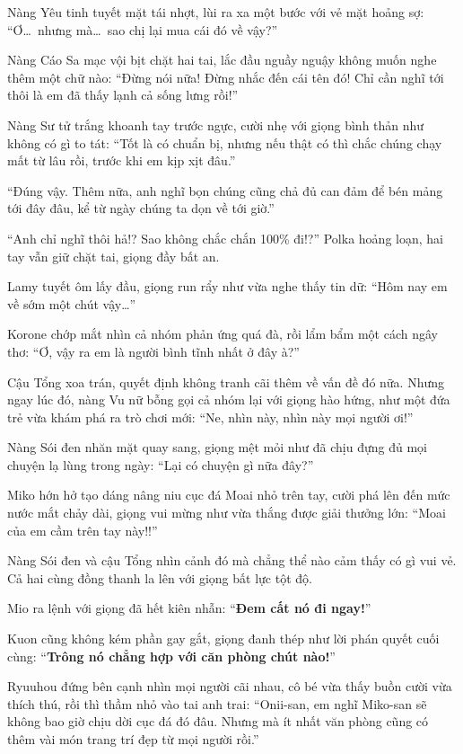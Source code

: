 \documentclass[../main.tex]{subfiles}
\begin{document}
Nàng Yêu tinh tuyết mặt tái nhợt, lùi ra xa một bước với vẻ mặt hoảng sợ: ``Ơ\dots\ nhưng mà\dots\ sao chị lại mua cái đó về vậy?''

Nàng Cáo Sa mạc vội bịt chặt hai tai, lắc đầu nguầy nguậy không muốn nghe thêm một chữ nào: ``Đừng nói nữa! Đừng nhắc đến cái tên đó! Chỉ cần nghĩ tới thôi là em đã thấy lạnh cả sống lưng rồi!''

Nàng Sư tử trắng khoanh tay trước ngực, cười nhẹ với giọng bình thản như không có gì to tát: ``Tốt là có chuẩn bị, nhưng nếu thật có thì chắc chúng chạy mất từ lâu rồi, trước khi em kịp xịt đâu.''

``Đúng vậy. Thêm nữa, anh nghĩ bọn chúng cũng chả đủ can đảm để bén mảng tới đây đâu, kể từ ngày chúng ta dọn về tới giờ.''

``Anh chỉ nghĩ thôi hả!? Sao không chắc chắn 100\% đi!?'' Polka hoảng loạn, hai tay vẫn giữ chặt tai, giọng đầy bất an.

Lamy tuyết ôm lấy đầu, giọng run rẩy như vừa nghe thấy tin dữ: ``Hôm nay em về sớm một chút vậy\dots''

Korone chớp mắt nhìn cả nhóm phản ứng quá đà, rồi lẩm bẩm một cách ngây thơ: ``Ơ, vậy ra em là người bình tĩnh nhất ở đây à?''

Cậu Tổng xoa trán, quyết định không tranh cãi thêm về vấn đề đó nữa. Nhưng ngay lúc đó, nàng Vu nữ bỗng gọi cả nhóm lại với giọng hào hứng, như một đứa trẻ vừa khám phá ra trò chơi mới: ``Ne, nhìn này, nhìn này mọi người ơi!''

Nàng Sói đen nhăn mặt quay sang, giọng mệt mỏi như đã chịu đựng đủ mọi chuyện lạ lùng trong ngày: ``Lại có chuyện gì nữa đây?''

Miko hớn hở tạo dáng nâng niu cục đá Moai nhỏ trên tay, cười phá lên đến mức nước mắt chảy dài, giọng vui mừng như vừa thắng được giải thưởng lớn: ``Moai của em cầm trên tay này!!''


Nàng Sói đen và cậu Tổng nhìn cảnh đó mà chẳng thể nào cảm thấy có gì vui vẻ. Cả hai cùng đồng thanh la lên với giọng bất lực tột độ.

Mio ra lệnh với giọng đã hết kiên nhẫn: ``\textbf{Đem cất nó đi ngay!}''

Kuon cũng không kém phần gay gắt, giọng đanh thép như lời phán quyết cuối cùng: ``\textbf{Trông nó chẳng hợp với căn phòng chút nào!}''

Ryuuhou đứng bên cạnh nhìn mọi người cãi nhau, cô bé vừa thấy buồn cười vừa thích thú, rồi thì thầm nhỏ vào tai anh trai: ``Onii-san, em nghĩ Miko-san sẽ không bao giờ chịu dời cục đá đó đâu. Nhưng mà ít nhất văn phòng cũng có thêm vài món trang trí đẹp từ mọi người rồi.''
\end{document}
